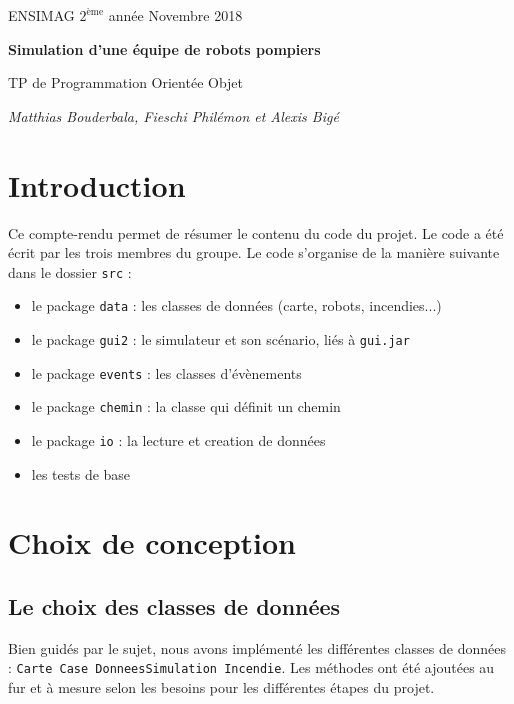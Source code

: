 \documentclass[12pt]{article}
\newcommand{\noi}{\noindent}
\begin{document}
\baselineskip7mm

\noi ENSIMAG $2^{\mbox{ème}}$ année   \hfill Novembre 2018


\vspace{1cm}


\begin{center}
{\Large \bf Simulation d'une équipe de robots pompiers

\vspace{3mm}

\normalsize TP de Programmation Orientée Objet

\vspace{3mm}
{\it \small Matthias Bouderbala, Fieschi Philémon et Alexis Bigé}
}
\end{center}

\section{Introduction}

Ce compte-rendu permet de résumer le contenu du code du projet. Le code a été écrit par les trois membres du groupe. Le code s'organise de la manière suivante dans le dossier {\tt src} :
\begin{itemize}
  \item le package {\tt data} : les classes de données (carte, robots, incendies...)
  \item le package {\tt gui2} : le simulateur et son scénario, liés à {\tt gui.jar}
  \item le package {\tt events} : les classes d'évènements
  \item le package {\tt chemin} : la classe qui définit un chemin
  \item le package {\tt io} : la lecture et creation de données
  \item les tests de base
\end{itemize}

\section{Choix de conception}

\subsection{Le choix des classes de données}
Bien guidés par le sujet, nous avons implémenté les différentes classes de données : {\tt Carte Case DonneesSimulation Incendie}. Les méthodes ont été ajoutées au fur et à mesure selon les besoins pour les différentes étapes du projet.\\
\end{document}
